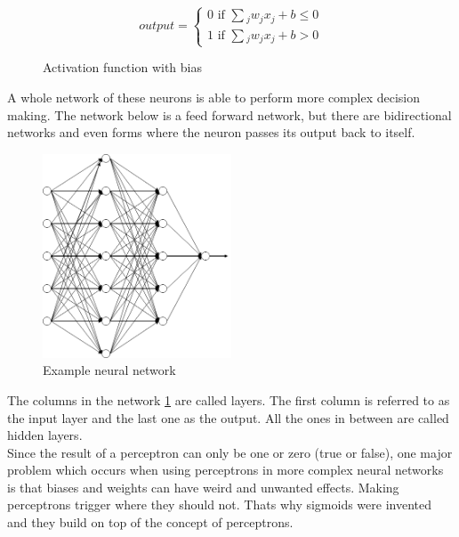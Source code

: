 \vspace{0.25cm}
\begin{figure}[hbt!]
    \caption{Activation function with bias}
    \begin{equation*}
        output=
        \begin{cases}
            0 \text{ if } \sum{_j}{w_jx_j+b \le 0}\\
            1 \text{ if } \sum{_j}{w_jx_j+b > 0}
        \end{cases}
    \end{equation*}
\end{figure}
\vspace{0.25cm}
A whole network of these neurons is able to perform more complex decision making. The network below is a feed forward network, but there are
bidirectional networks and even forms where the neuron passes its output back to itself. 
\vspace{0.25cm}
\begin{figure}[hbt!]
    \caption{Example neural network}
    \begin{center}
        \includegraphics[width=0.5\textwidth]{images/neurons/neural_network.png}
    \end{center}
    \label{fig:neural-network}
\end{figure}
\newpage \noindent
The columns in the network \ref{fig:neural-network} are called layers. The first column is referred to as the input layer and the last one as the output. All the
ones in between are called hidden layers. \\
Since the result of a perceptron can only be one or zero (true or false), one major problem which occurs when using perceptrons in more
complex neural networks is that biases and weights can have weird and unwanted effects. Making perceptrons trigger where they should not.
Thats why sigmoids were invented and they build on top of the concept of perceptrons.

